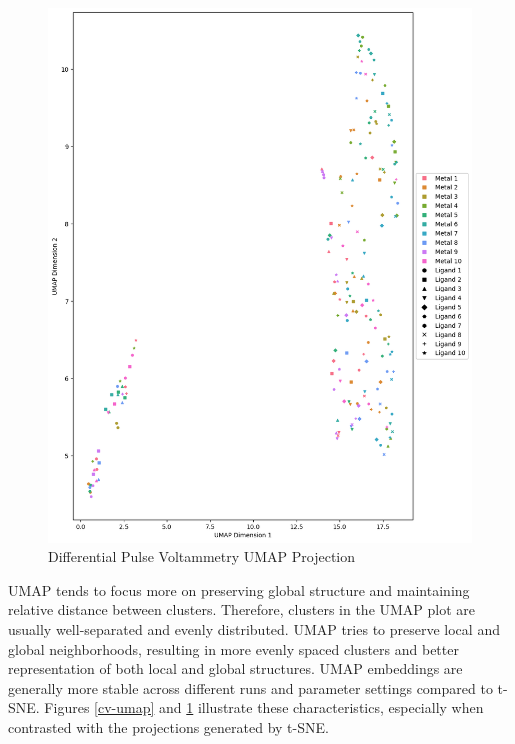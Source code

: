\begin{figure}[h!]
  \centering
    \includegraphics[width=1.0\textwidth]{figures/dpv_umap.png}
    \caption{Differential Pulse Voltammetry UMAP Projection}
    \label{dpv-umap}
\end{figure}
UMAP tends to focus more on preserving global structure and maintaining relative distance between clusters. Therefore, clusters in the UMAP plot are usually well-separated and evenly distributed. UMAP tries to preserve local and global neighborhoods, resulting in more evenly spaced clusters and better representation of both local and global structures. UMAP embeddings are generally more stable across different runs and parameter settings compared to t-SNE. Figures \ref{cv-umap} and \ref{dpv-umap} illustrate these characteristics, especially when contrasted with the projections generated by t-SNE.


